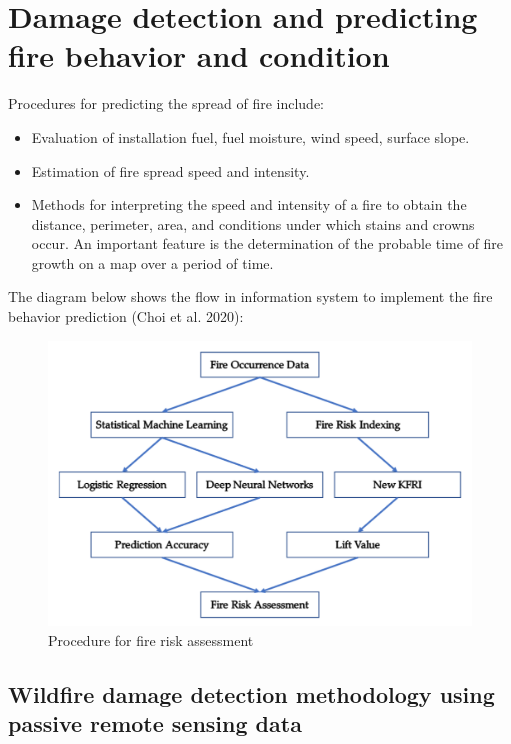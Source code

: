 \chapter{Damage detection and predicting fire behavior and condition}
	\label{cha:methodology}
	
	Procedures for predicting the spread of fire include:
	
	\begin{itemize}
		\item Evaluation of installation fuel, fuel moisture, wind speed, surface slope.
		\item Estimation of fire spread speed and intensity.
		\item Methods for interpreting the speed and intensity of a fire to obtain the distance, perimeter, area, and conditions under which stains and crowns occur. An important feature is the determination of the probable time of fire growth on a map over a period of time.
	\end{itemize}

	The diagram below shows the flow in information system to implement the fire behavior prediction (Choi et al. 2020):
	
	\begin{figure}[H]
		\centering
		\includegraphics[width=0.9\linewidth]{images/fire_assesment_procedure.png}
		\caption{Procedure for fire risk assessment}
		\label{fig:fire_assesment_procedurel}
	\end{figure}
	
\section{Wildfire damage detection methodology using passive remote sensing data}

